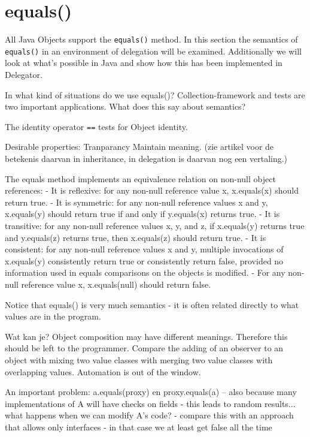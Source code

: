 \documentclass[a4paper,12pt]{book}
\begin{document}
\section*{equals()}
All Java Objects support the \verb|equals()| method. In this section the semantics of \verb|equals()| in an environment of delegation will be examined. Additionally we will look at what's possible in Java and show how this has been implemented in Delegator.

In what kind of situations do we use equals()? Collection-framework and tests are two important applications. What does this say about semantics?

The identity operator \verb|==| tests for Object identity.

Desirable properties:
Tranparancy
Maintain meaning. (zie artikel voor de betekenis daarvan in inheritance, in delegation is daarvan nog een vertaling.)


The equals method implements an equivalence relation on non-null object references: 
- It is reflexive: for any non-null reference value x, x.equals(x) should return true. 
- It is symmetric: for any non-null reference values x and y, x.equals(y) should return true if and only if y.equals(x) 
 returns true. 
- It is transitive: for any non-null reference values x, y, and z, if x.equals(y) returns true and y.equals(z) returns true, then x.equals(z) should return true. 
- It is consistent: for any non-null reference values x and y, multiple invocations of x.equals(y) consistently return true or consistently return false, provided no information used in equals comparisons on the objects is modified. 
- For any non-null reference value x, x.equals(null) should return false.


Notice that equals() is very much semantics - it is often related directly to what values are in the program.

Wat kan je?
Object composition may have different meanings. Therefore this should be left to the programmer. Compare the adding of an observer to an object with mixing two value classes with merging two value classes with overlapping values. Automation is out of the window.


An important problem:
a.equals(proxy) en proxy.equals(a) -- also because many implementations of A will have checks on fields
- this leads to random results...
what happens when we can modify A's code?
 - compare this with an approach that allows only interfaces - in that case we at least get false all the time
\end{document}
